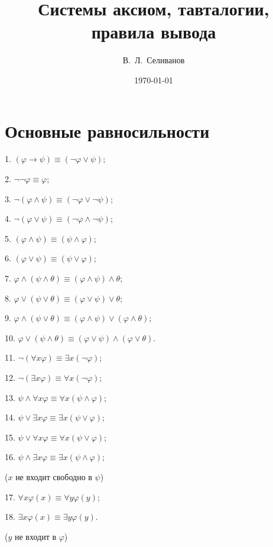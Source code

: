 \documentclass[a4paper,11pt]{article}
\title{Системы аксиом, тавталогии, правила вывода}
\date{\today}
\author{В.~Л.~Селиванов}
\begin{document}
 \maketitle

\section{Основные равносильности}

1. $(\varphi\rightarrow\psi)\equiv(\neg\varphi\lor\psi)$; 

2. $\neg\neg\varphi\equiv
\varphi$;

3. $\neg (\varphi \land \psi)\equiv (\neg\varphi\lor \neg\psi)$;

4. $\neg(\varphi \lor \psi) \equiv(\neg\varphi \land \neg\psi)$;

5. $(\varphi\land\psi) \equiv(\psi \land \varphi)$; 

6. $(\varphi
\lor \psi)
\equiv(\psi \lor \varphi)$;

7. $\varphi\land(\psi\land\theta)\equiv(\varphi\land\psi)\land\theta$;

8. $\varphi\lor (\psi\lor \theta) \equiv(\varphi \lor \psi) \lor \theta$;

9. $\varphi\land(\psi\lor\theta)\equiv(\varphi\land\psi)\lor(\varphi\land
\theta)$; 

10. $\varphi\lor(\psi\land\theta)\equiv(\varphi\lor\psi)\land(\varphi
\lor\theta)$.
\vspace{10mm}

11. $\neg(\forall x \varphi)\equiv \exists x (\neg\varphi)$; 

12. $\neg (\exists x \varphi)\equiv \forall x
(\neg\varphi)$;

13. $\psi \land \forall x \varphi\equiv \forall x (\psi\land
\varphi)$; 

14. $\psi\lor \exists x \varphi \equiv
\exists x (\psi \lor \varphi)$;

15. $\psi \lor \forall x \varphi\equiv \forall x (\psi\lor
\varphi)$; 

16. $\psi \land\exists x \varphi \equiv\exists x (\psi \land \varphi)$;

($x$  не входит свободно в $\psi$)

17. $\forall x \varphi(x) \equiv\forall y \varphi(y)$; 

18. $\exists
x\varphi(x) \equiv \exists y\varphi(y)$.

($y$ не входит в $\varphi$)

\pagebreak
\end{document}
